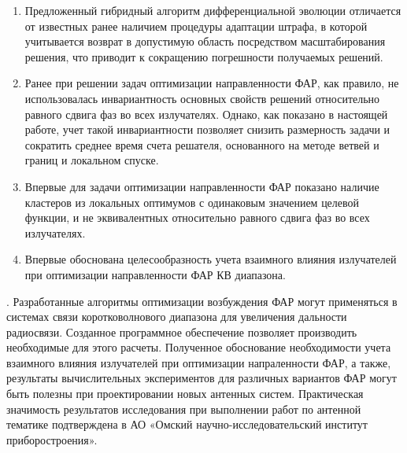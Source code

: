 \begin{enumerate}
  \item Предложенный гибридный алгоритм дифференциальной эволюции отличается от известных ранее наличием процедуры адаптации штрафа, в которой учитывается возврат в допустимую область посредством масштабирования решения, что приводит к сокращению погрешности получаемых решений.
  \item Ранее при решении задач оптимизации направленности ФАР, как правило, не использовалась инвариантность основных свойств решений относительно равного сдвига фаз во всех излучателях. Однако, как показано в настоящей работе, учет такой инвариантности позволяет снизить размерность задачи и сократить среднее время счета решателя, основанного на методе ветвей и границ и локальном спуске.
  \item Впервые для задачи оптимизации направленности ФАР  показано наличие кластеров из локальных оптимумов с одинаковым значением целевой функции, и не эквивалентных относительно равного сдвига фаз во всех излучателях.
  \item Впервые обоснована целесообразность учета взаимного влияния излучателей при оптимизации направленности ФАР КВ диапазона.
\end{enumerate}


{\influence}.
Разработанные алгоритмы оптимизации возбуждения ФАР могут  применяться в системах связи коротковолнового диапазона для увеличения дальности
радиосвязи.
Созданное программное обеспечение позволяет производить необходимые для этого расчеты.
Полученное обоснование необходимости учета взаимного влияния излучателей при оптимизации напраленности ФАР, а также, результаты вычислительных экспериментов для различных вариантов ФАР могут быть полезны при проектировании новых антенных систем.
Практическая значимость результатов исследования при выполнении работ по антенной тематике
подтверждена в АО «Омский научно-исследовательский институт приборостроения».


